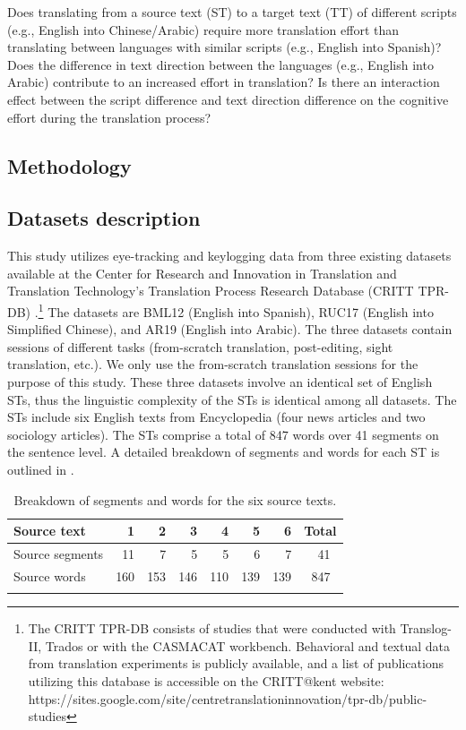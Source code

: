 \documentclass[output=paper]{langscibook}
\begin{document}
\ea
Does translating from a source text (ST) to a target text (TT) of different scripts (e.g., English into Chinese/Arabic) require more translation effort than translating between languages with similar scripts (e.g., English into Spanish)? 
\z
\ea
Does the difference in text direction between the languages (e.g., English into Arabic) contribute to an increased effort in translation? 
\z
\ea
Is there an interaction effect between the script difference and text direction difference on the cognitive effort during the translation process?
\z

\subsection{{Methodology}  }

\subsection{Datasets description}

This study utilizes eye-tracking and keylogging data from three existing datasets available at the Center for Research and Innovation in Translation and Translation Technology’s Translation Process Research Database (CRITT TPR-DB) \citep{CarlEtAl2016}.\footnote{The CRITT TPR-DB consists of studies that were conducted with Translog-II, Trados or with the CASMACAT workbench. Behavioral and textual data from translation experiments is publicly available, and a list of publications utilizing this database is accessible on the CRITT@kent website: https://sites.google.com/site/centretranslationinnovation/tpr-db/public-studies} The datasets are BML12 (English into Spanish), RUC17 (English into Simplified Chinese), and AR19 (English into Arabic). The three datasets contain sessions of different tasks (from-scratch translation, post-editing, sight translation, etc.). We only use the from-scratch translation sessions for the purpose of this study. These three datasets involve an identical set of English STs, thus the linguistic complexity of the STs is identical among all datasets. The STs include six English texts from Encyclopedia (four news articles and two sociology articles). The STs comprise a total of 847 words over 41 segments on the sentence level. A detailed breakdown of segments and words for each ST is outlined in .

\begin{table}
\begin{tabularx}{\textwidth}{Xrrrrrrr}
\lsptoprule
  {Source text} & {1} & {2} & {3} & {4} & {5} & {6} & {Total}\\
  \midrule
  {Source segments} & 11 & 7 & 5 & 5 & 6 & 7 & 41~\\
  {Source words} & 160 & 153 & 146 & 110 & 139 & 139 & 847~\\
\lspbottomrule
\end{tabularx}
\caption{\label{tab:saedi:1}Breakdown of segments and words for the six source texts.}
\end{table}
\end{document}
